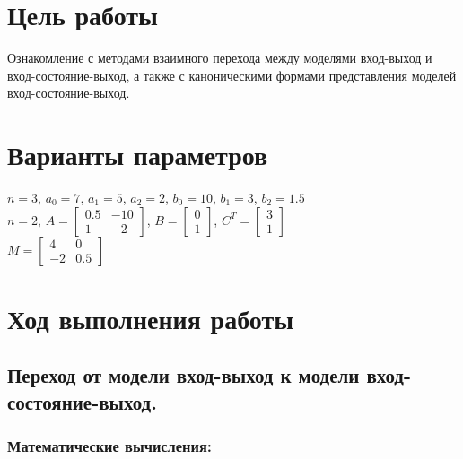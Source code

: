







\section{Цель работы}
Ознакомление с методами взаимного перехода между моделями вход-выход и вход-состояние-выход, а также с каноническими формами представления моделей вход-состояние-выход.


\section{Варианты параметров}
$n = 3$, $a_0 = 7$, $a_1 = 5$, $a_2 = 2$, $b_0 = 10$, $b_1 = 3$, $b_2 = 1.5$\\

$n = 2$,  $A = \begin{bmatrix}
				0.5 & -10\\
				1 & -2
				\end{bmatrix}$, $B = \begin{bmatrix}
									0\\
									1
									\end{bmatrix}$, $C^T = \begin{bmatrix}
															3\\
															1
															\end{bmatrix}$\\			
													
$M = \begin{bmatrix}
				4 & 0\\
				-2 & 0.5
				\end{bmatrix}$															


\section{Ход выполнения работы}

\subsection{Переход от модели вход-выход к модели вход-состояние-выход.}

\subsubsection{Математические вычисления:}

